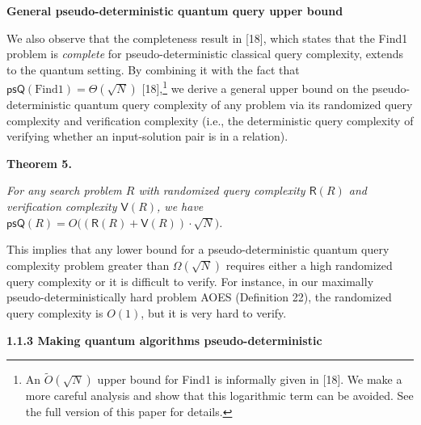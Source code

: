 \documentclass[10pt,a4paper]{article}
\begin{document}
\par\medskip\noindent\textbf{General pseudo-deterministic quantum query upper bound}\par




We also observe that the completeness result in [18], which states that the Find1 problem is \emph{complete} for pseudo-deterministic classical query complexity, extends to the quantum setting. By combining it with the fact that $\mathsf{psQ}({\text{Find1}})=\Theta(\sqrt{N})$ [18],\footnote{An $\tilde{O}(\sqrt{N})$ upper bound for Find1 is informally given in [18]. We make a more careful analysis and show that this logarithmic term can be avoided. See the full version of this paper for details.} we derive a general upper bound on the pseudo-deterministic quantum query complexity of any problem via its randomized query complexity and verification complexity (i.e., the deterministic query complexity of verifying whether an input-solution pair is in a relation).\par





\par\medskip\noindent\textbf{
\textbf{Theorem 5}\textbf{.}
}\par



\emph{For any search problem ${R}$ with randomized query complexity $\mathsf{R}(R)$ and verification complexity $\mathsf{V}(R)$, we have $\mathsf{psQ}(R)=O\big((\mathsf{R}(R)+\mathsf{V}(R))\cdot\sqrt{N}\big)$.}\par






This implies that any lower bound for a pseudo-deterministic quantum query complexity problem greater than $\Omega(\sqrt{N})$ requires either a high randomized query complexity or it is difficult to verify. For instance, in our maximally pseudo-deterministically hard problem AOES (Definition 22), the randomized query complexity is $O(1)$, but it is very hard to verify.\par






\par\medskip\noindent\textbf{
1.1.3 Making quantum algorithms pseudo-deterministic}\par
\end{document}
